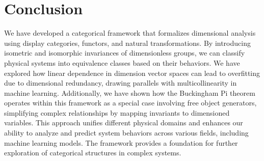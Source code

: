 \documentclass{article}
\theoremstyle{definition}
\theoremstyle{remark}
\begin{document}
	\section{Conclusion}
	
	We have developed a categorical framework that formalizes dimensional analysis using display categories, functors, and natural transformations. By introducing isometric and isomorphic invariances of dimensionless groups, we can classify physical systems into equivalence classes based on their behaviors. We have explored how linear dependence in dimension vector spaces can lead to overfitting due to dimensional redundancy, drawing parallels with multicollinearity in machine learning. Additionally, we have shown how the Buckingham Pi theorem operates within this framework as a special case involving free object generators, simplifying complex relationships by mapping invariants to dimensioned variables. This approach unifies different physical domains and enhances our ability to analyze and predict system behaviors across various fields, including machine learning models. The framework provides a foundation for further exploration of categorical structures in complex systems.
	
\end{document}
